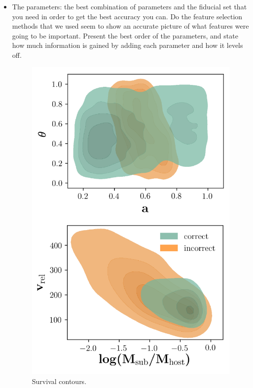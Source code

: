 \documentclass[fleqn,usenatbib]{mnras}
\begin{document}
\begin{itemize}
\begin{figure}[h]
    \caption{Survival.}
    \label{fig:survival_predictions}
\end{figure}[h]
    \item The parameters: the best combination of parameters and the fiducial set that you need in order to get the best accuracy you can. Do the feature selection methods that we used seem to show an accurate picture of what features were going to be important. Present the best order of the parameters, and state how much information is gained by adding each parameter and how it levels off. 
\begin{figure}
	\includegraphics[width=\textwidth]{Figures/survival_contours}
    \caption{Survival contours.}
    \label{fig:survival_contours}
\end{figure}
\end{itemize}
\end{document}
